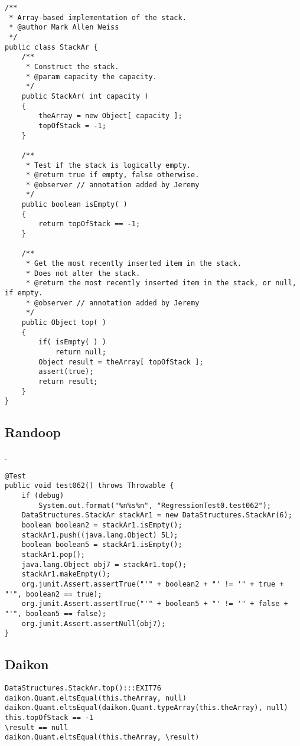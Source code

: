 \begin{lstlisting}[style=javastyle, caption=Ejemplo StackAr.top, label=lst:top]
/**
 * Array-based implementation of the stack.
 * @author Mark Allen Weiss
 */
public class StackAr {
    /**
     * Construct the stack.
     * @param capacity the capacity.
     */
    public StackAr( int capacity )
    {
        theArray = new Object[ capacity ];
        topOfStack = -1;
    }

    /**
     * Test if the stack is logically empty.
     * @return true if empty, false otherwise.
     * @observer // annotation added by Jeremy
     */
    public boolean isEmpty( )
    {
        return topOfStack == -1;
    }

    /**
     * Get the most recently inserted item in the stack.
     * Does not alter the stack.
     * @return the most recently inserted item in the stack, or null, if empty.
     * @observer // annotation added by Jeremy
     */
    public Object top( )
    {
        if( isEmpty( ) )
            return null;
        Object result = theArray[ topOfStack ];
    	assert(true);
        return result;
    }
}
\end{lstlisting}


\subsection{Randoop}.


\begin{lstlisting}[style=javastyle, caption=Aserción generada con Randoop, label=lst:randoop]
@Test
public void test062() throws Throwable {
    if (debug)
        System.out.format("%n%s%n", "RegressionTest0.test062");
    DataStructures.StackAr stackAr1 = new DataStructures.StackAr(6);
    boolean boolean2 = stackAr1.isEmpty();
    stackAr1.push((java.lang.Object) 5L);
    boolean boolean5 = stackAr1.isEmpty();
    stackAr1.pop();
    java.lang.Object obj7 = stackAr1.top();
    stackAr1.makeEmpty();
    org.junit.Assert.assertTrue("'" + boolean2 + "' != '" + true + "'", boolean2 == true);
    org.junit.Assert.assertTrue("'" + boolean5 + "' != '" + false + "'", boolean5 == false);
    org.junit.Assert.assertNull(obj7);
}
\end{lstlisting}


\subsection{Daikon}

\begin{lstlisting}[style=javastyle, caption=Aserción generada con Daikon, label=lst:daikon]
DataStructures.StackAr.top():::EXIT76
daikon.Quant.eltsEqual(this.theArray, null)
daikon.Quant.eltsEqual(daikon.Quant.typeArray(this.theArray), null)
this.topOfStack == -1
\result == null
daikon.Quant.eltsEqual(this.theArray, \result)

\end{lstlisting}
